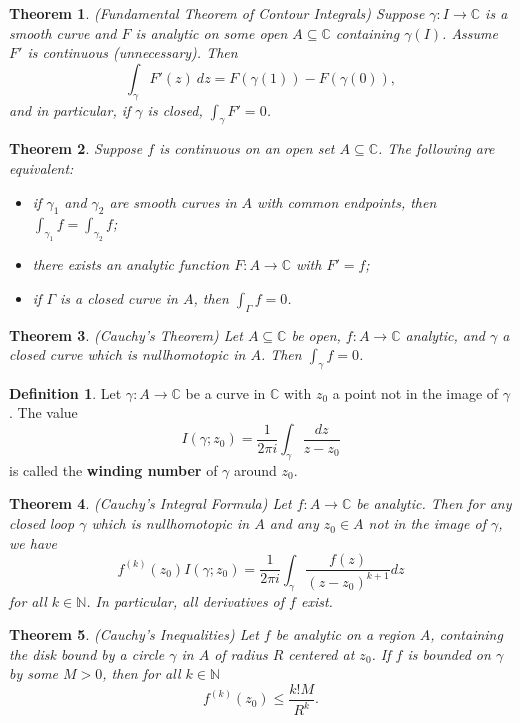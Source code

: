 \documentclass[11pt]{amsart}
\newtheorem*{theorem*}{Theorem}
\theoremstyle{definition}
\newtheorem*{definition*}{Definition}
\renewcommand\leq{\leqslant}
\renewcommand\:{\colon}
\newcommand{\C}{\mathds{C}}
\newcommand{\N}{\mathds{N}}
\begin{document}
\begin{theorem*}
	\textnormal{(Fundamental Theorem of Contour Integrals)} Suppose $\gamma\: I \to \C$ is a smooth curve and $F$ is analytic on some open $A \subseteq \C$ containing $\gamma(I)$. Assume $F'$ is continuous (unnecessary). Then 
		\[ \int_\gamma F'(z) \ dz = F(\gamma(1)) - F(\gamma(0)), \]
	and in particular, if $\gamma$ is closed, $\int_\gamma F' = 0$.
\end{theorem*}

\begin{theorem*}
	Suppose $f$ is continuous on an open set $A \subseteq \C$. The following are equivalent:
	\begin{itemize}[leftmargin=22.5pt]\setlength\itemsep{0em}
		\item[\textnormal{(i)}] if $\gamma_1$ and $\gamma_2$ are smooth curves in $A$ with common endpoints, then $\int_{\gamma_1} f = \int_{\gamma_2} f$;
		\item[\textnormal{(ii)}] there exists an analytic function $F\: A \to \C$ with $F' = f$;
		\item[\textnormal{(iii)}] if $\Gamma$ is a closed curve in $A$, then $\int_\Gamma f = 0$.
	\end{itemize}
\end{theorem*}

\begin{theorem*}
	\textnormal{(Cauchy's Theorem)} Let $A \subseteq \C$ be open, $f\: A \to \C$ analytic, and $\gamma$ a closed curve which is nullhomotopic in $A$. Then $\int_\gamma f = 0$.
\end{theorem*}

\begin{definition*}
	Let $\gamma\: A \to \C$ be a curve in $\C$ with $z_0$ a point not in the image of $\gamma$. The value
		\[ I(\gamma; z_0) = \frac1{2\pi i} \int_\gamma \frac{dz}{z - z_0} \]
	is called the \textbf{winding number} of $\gamma$ around $z_0$.
\end{definition*}

\begin{theorem*}
	\textnormal{(Cauchy's Integral Formula)} Let $f\: A \to \C$ be analytic. Then for any closed loop $\gamma$ which is nullhomotopic in $A$ and any $z_0 \in A$ not in the image of $\gamma$, we have
		\[ f^{(k)}(z_0) I(\gamma; z_0) = \frac1{2\pi i} \int_\gamma \frac{f(z)}{(z - z_0)^{k+1}} dz \]
	for all $k \in \N$. In particular, all derivatives of $f$ exist.
\end{theorem*}

\begin{theorem*}
	\textnormal{(Cauchy's Inequalities)} Let $f$ be analytic on a region $A$, containing the disk bound by a circle $\gamma$ in $A$ of radius $R$ centered at $z_0$. If $f$ is bounded on $\gamma$ by some $M > 0$, then for all $k \in \N$
		\[ f^{(k)}(z_0) \leq \frac{k!M}{R^k}. \]
\end{theorem*}
\end{document}
